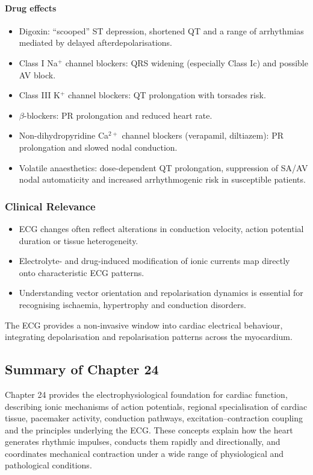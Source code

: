 \documentclass[11pt,a4paper]{article}
\begin{document}
\paragraph{Drug effects}
\begin{itemize}
  \item Digoxin: ``scooped'' ST depression, shortened QT and a range of arrhythmias mediated by delayed afterdepolarisations.
  \item Class I Na$^+$ channel blockers: QRS widening (especially Class Ic) and possible AV block.
  \item Class III K$^+$ channel blockers: QT prolongation with torsades risk.
  \item $\beta$-blockers: PR prolongation and reduced heart rate.
  \item Non-dihydropyridine Ca$^{2+}$ channel blockers (verapamil, diltiazem): PR prolongation and slowed nodal conduction.
  \item Volatile anaesthetics: dose-dependent QT prolongation, suppression of SA/AV nodal automaticity and increased arrhythmogenic risk in susceptible patients.
\end{itemize}

\subsubsection{Clinical Relevance}

\begin{itemize}
  \item ECG changes often reflect alterations in conduction velocity, action potential duration or tissue heterogeneity.
  \item Electrolyte- and drug-induced modification of ionic currents map directly onto characteristic ECG patterns.
  \item Understanding vector orientation and repolarisation dynamics is essential for recognising ischaemia, hypertrophy and conduction disorders.
\end{itemize}

The ECG provides a non-invasive window into cardiac electrical behaviour, integrating depolarisation and repolarisation patterns across the myocardium.

\subsection{Summary of Chapter 24}

Chapter 24 provides the electrophysiological foundation for cardiac function, describing ionic mechanisms of action potentials, regional specialisation of cardiac tissue, pacemaker activity, conduction pathways, excitation--contraction coupling and the principles underlying the ECG. These concepts explain how the heart generates rhythmic impulses, conducts them rapidly and directionally, and coordinates mechanical contraction under a wide range of physiological and pathological conditions.
\end{document}
